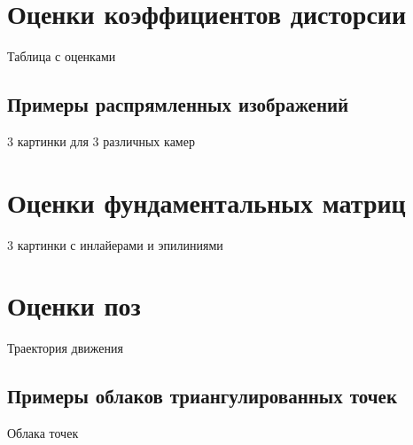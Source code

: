 \section{Оценки коэффициентов дисторсии}
Таблица с оценками
\subsection{Примеры распрямленных изображений}
3 картинки для 3 различных камер
\section{Оценки фундаментальных матриц}
3 картинки с инлайерами и эпилиниями
\section{Оценки поз}
Траектория движения
\subsection{Примеры облаков триангулированных точек}
Облака точек